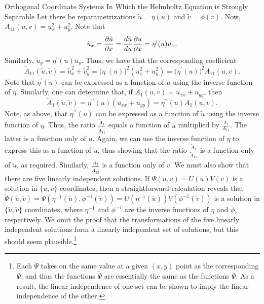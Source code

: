 \begin{section}{Orthogonal Coordinate Systems In Which the Helmholtz Equation is Strongly Separable}
Let there be reparametrizations $\tilde{u} = \eta(u)$ and $\tilde{v} = \phi(v)$.  Now, $A_{11}(u,v) = u_x^2 +u_y^2$.  Note that
\[
\tilde{u}_x = \frac{\partial \tilde{u}}{\partial x} = \frac{d \tilde{u}}{d u} \frac{\partial u}{\partial x} = \eta^\prime(u) u_x.
\]
Similarly, $\tilde{u}_y = \eta^\prime(u) u_y$.  Thus, we have that the corresponding coefficient
\[
\tilde{A}_{11}(\tilde{u},\tilde{v}) = \tilde{u}_x^2 + \tilde{v}_y^2 = \big(\eta^\prime(u)\big)^2 \left( u_x^2 + u_y^2 \right) = \big(\eta^\prime(u)\big)^2 A_{11}(u,v).
\]
Note that $\eta^\prime(u)$ can be expressed as a function of $\tilde{u}$ using the inverse function of $\eta$.  Similarly, one can determine that, if $A_1(u,v) = u_{xx} + u_{yy}$, then
\[
\tilde{A}_1(\tilde{u},\tilde{v}) = \eta^{\prime\prime}(u)(u_{xx} + u_{yy}) = \eta^{\prime\prime}(u)A_1(u,v).
\]
Note, as above, that $\eta^{\prime\prime}(u)$ can be expressed as a function of $\tilde{u}$ using the inverse function of $\eta$.  Thus, the ratio $\frac{\tilde{A}_1}{\tilde{A}_{11}}$ equals a function of $\tilde{u}$ multiplied by $\frac{A_1}{A_{11}}$.  The latter is a function only of $u$.  Again, we can use the inverse function of $\eta$ to express this as a function of $\tilde{u}$, thus showing that the ratio $\frac{\tilde{A}_1}{\tilde{A}_{11}}$ is a function only of $\tilde{u}$, as required.  Similarly, $\frac{\tilde{A}_2}{\tilde{A}_{22}}$ is a function only of $v$.  We must also show that there are five linearly independent solutions.  If $\Psi(u,v) = U(u)V(v)$ is a solution in $\{ u,v \}$ coordinates, then a straightforward calculation reveals that $\widetilde{\Psi}(\tilde{u},\tilde{v}) = \Psi(\eta^{-1}(\tilde{u}),\phi^{-1}(\tilde{v})) = U(\eta^{-1}(\tilde{u}))V(\phi^{-1}(\tilde{v}))$ is a solution in $\{ \tilde{u},\tilde{v} \}$ coordinates, where $\eta^{-1}$ and $\phi^{-1}$ are the inverse functions of $\eta$ and $\phi$, respectively.  We omit the proof that the transformations of the five linearly independent solutions form a linearly independent set of solutions, but this should seem plausible.\footnote{Each $\widetilde{\Psi}$ takes on the same value at a given $(x,y)$ point as the corresponding $\Psi$, and thus the functions $\tilde{\Psi}$ are essentially the same as the functions $\Psi$.  As a result, the linear independence of one set can be shown to imply the linear independence of the other.}


\end{section}
